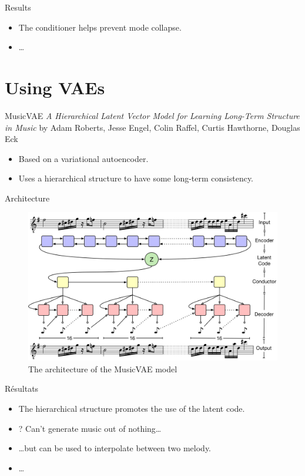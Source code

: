 \documentclass{beamer}
\begin{document}
\begin{frame}{Results}
\begin{itemize}
	\item The conditioner helps prevent mode collapse.
	\item \dots
\end{itemize}
\end{frame}

\section{Using VAEs}
\begin{frame}{MusicVAE}
\textit{A Hierarchical Latent Vector Model for Learning Long-Term Structure in Music}
by Adam Roberts, Jesse Engel, Colin Raffel, Curtis Hawthorne, Douglas Eck
\begin{itemize}
	\item Based on a variational autoencoder.
	\item Uses a hierarchical structure to have some long-term consistency.
\end{itemize}
\end{frame}

\begin{frame}{Architecture}
\begin{figure}[h]
\centering
\includegraphics[width=\linewidth]{musicVAE}
\caption{The architecture of the MusicVAE model}
\end{figure}
\end{frame}

\begin{frame}{Résultats}
\begin{itemize}
	\item The hierarchical structure promotes the use of the latent code.
	\item ? Can't generate music out of nothing\dots
	\item \dots but can be used to interpolate between two melody.
	\item \dots
\end{itemize}
\end{frame}
\end{document}
